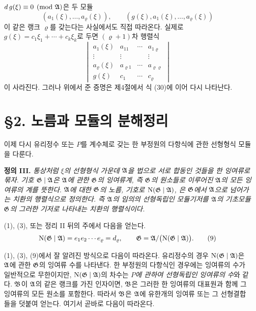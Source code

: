 \(d\,g(\xi)\equiv0\pmod{\mathfrak A}\)은 두 모듈
\[
(a_1(\xi),\ldots,a_\varrho(\xi)),\qquad
(g(\xi),a_1(\xi),\ldots,a_\varrho(\xi))
\]
이 같은 랭크 \(\varrho\)를 갖는다는 사실에서도 직접 따라온다. 실제로 \(g(\xi)=c_1\xi_1+\cdots+c_k\xi_k\)로 두면 \((\varrho+1)\)차 행렬식
\[
\begin{vmatrix}
a_1(\xi)&a_{11}&\cdots&a_{1\varrho}\\
\vdots&\vdots&&\vdots\\
a_\varrho(\xi)&a_{\varrho1}&\cdots&a_{\varrho\varrho}\\
g(\xi)&c_1&\cdots&c_\varrho
\end{vmatrix}
\]
이 사라진다. 그러나 위에서 준 증명은 제4절에서 식 (30)에 이어 다시 나타난다.

\section*{\S{}2. 노름과 모듈의 분해정리}

이제 다시 유리정수 또는 \(P\)를 계수체로 갖는 한 부정원의 다항식에 관한 선형형식 모듈을 다룬다.

\medskip
\noindent\textbf{정의 III.} \emph{통상처럼 \(\xi\)의 선형형식 가운데 \(\mathfrak A\)을 법으로 서로 합동인 것들을 한 잉여류로 묶자. 기호 \(\mathfrak G\mid\mathfrak A\)은 \(\mathfrak A\)에 관한 \(\mathfrak G\)의 잉여류계, 즉 \(\mathfrak G\)의 원소들로 이루어진 \(\mathfrak A\)의 모든 잉여류의 계를 뜻한다. \(\mathfrak A\)에 대한 \(\mathfrak G\)의 노름, 기호로 \(\operatorname N(\mathfrak G\mid\mathfrak A)\), 은 \(\mathfrak G\)에서 \(\mathfrak A\)으로 넘어가는 치환의 행렬식으로 정의한다. 즉 \(\mathfrak A\)의 임의의 선형독립인 모듈기저를 \(\mathfrak A\)의 기초모듈 \(\mathfrak G\)의 그러한 기저로 나타내는 치환의 행렬식이다.}

(1), (3), 또는 정리 II 뒤의 주에서 다음을 얻는다.
\begin{equation}
\operatorname N(\mathfrak G\mid\mathfrak A)=e_1e_2\cdots e_\varrho=d_\varrho,
\qquad
\mathfrak G=\mathfrak A/\bigl(\operatorname N(\mathfrak G\mid\mathfrak A)\bigr).
\tag{9}
\end{equation}

(1), (3), (9)에서 잘 알려진 방식으로 다음이 따라온다. 유리정수의 경우 \(\operatorname N(\mathfrak G\mid\mathfrak A)\)은 \(\mathfrak A\)에 관한 \(\mathfrak G\)의 잉여류 수를 나타낸다. 한 부정원의 다항식인 경우에는 잉여류의 수가 일반적으로 무한이지만, \(\operatorname N(\mathfrak G\mid\mathfrak A)\)의 차수는 \emph{\(P\)에 관하여 선형독립인 잉여류의 수}와 같다. \(\mathfrak B\)이 \(\mathfrak A\)의 같은 랭크를 가진 인자이면, \(\mathfrak B\)은 그러한 한 잉여류의 대표원과 함께 그 잉여류의 모든 원소를 포함한다. 따라서 \(\mathfrak B\)은 \(\mathfrak A\)에 유한개의 잉여류 또는 그 선형결합들을 덧붙여 얻는다. 여기서 곧바로 다음이 따라온다.

